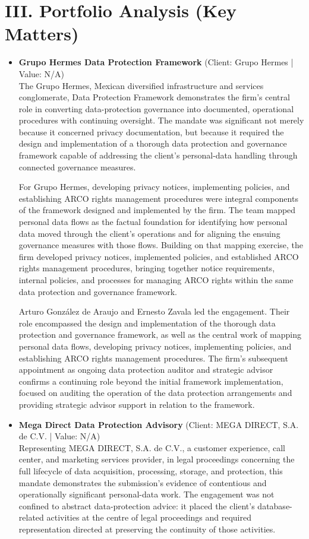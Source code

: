 \documentclass[11pt]{article}
\begin{document}
\section*{III. Portfolio Analysis (Key Matters)}
\begin{itemize}
\item \textbf{Grupo Hermes Data Protection Framework} (Client: Grupo Hermes | Value: N/A)\\ The Grupo Hermes, Mexican diversified infrastructure and services conglomerate, Data Protection Framework demonstrates the firm’s central role in converting data-protection governance into documented, operational procedures with continuing oversight. The mandate was significant not merely because it concerned privacy documentation, but because it required the design and implementation of a thorough data protection and governance framework capable of addressing the client’s personal-data handling through connected governance measures.

For Grupo Hermes, developing privacy notices, implementing policies, and establishing ARCO rights management procedures were integral components of the framework designed and implemented by the firm. The team mapped personal data flows as the factual foundation for identifying how personal data moved through the client’s operations and for aligning the ensuing governance measures with those flows. Building on that mapping exercise, the firm developed privacy notices, implemented policies, and established ARCO rights management procedures, bringing together notice requirements, internal policies, and processes for managing ARCO rights within the same data protection and governance framework.

Arturo González de Araujo and Ernesto Zavala led the engagement. Their role encompassed the design and implementation of the thorough data protection and governance framework, as well as the central work of mapping personal data flows, developing privacy notices, implementing policies, and establishing ARCO rights management procedures. The firm’s subsequent appointment as ongoing data protection auditor and strategic advisor confirms a continuing role beyond the initial framework implementation, focused on auditing the operation of the data protection arrangements and providing strategic advisor support in relation to the framework.
\item \textbf{Mega Direct Data Protection Advisory} (Client: MEGA DIRECT, S.A. de C.V. | Value: N/A)\\ Representing MEGA DIRECT, S.A. de C.V., a customer experience, call center, and marketing services provider, in legal proceedings concerning the full lifecycle of data acquisition, processing, storage, and protection, this mandate demonstrates the submission’s evidence of contentious and operationally significant personal-data work. The engagement was not confined to abstract data-protection advice: it placed the client’s database-related activities at the centre of legal proceedings and required representation directed at preserving the continuity of those activities.


\end{itemize}
\end{document}
